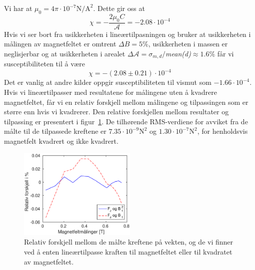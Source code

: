 \documentclass[a4paper,11pt, twocolumn]{article}
\begin{document}
Vi har at $\mu_0=4\pi\cdot10^{-7}\text{N/A}^2$. Dette gir oss at 
\begin{equation}
	\chi = -\frac{2\mu_0 C}{\mathcal{A}}= -2.08\cdot 10^{-4}
	\label{eq:susecpt}
\end{equation}
Hvis vi ser bort fra usikkerheten i lineærtilpasningen og bruker at usikkerheten i målingen av magnetfeltet er omtrent $\Delta B = 5\%$, usikkerheten i massen er neglisjerbar og at usikkerheten i arealet $\Delta\mathcal{A}=\sigma_{m,d}/$\textit{mean(d)}$\approx1.6\%$ får vi susceptibiliteten til å være 
\begin{equation}
	\chi = -(2.08\pm0.21) \cdot 10^{-4}
	\label{eq:chiResult}
\end{equation}
Det er vanlig at andre kilder oppgir susceptibiliteten til vismut som $-1.66\cdot 10^{-4}$.
Hvis vi lineærtilpasser med resultatene for målingene uten å kvadrere magnetfeltet, får vi en relativ forskjell mellom målingene og tilpassingen som er større enn hvis vi kvadrerer. Den relative forskjellen mellom resultater og tilpassing er presentert i figur~\ref{fig:relativForskjell}. De tilhørende RMS-verdiene for avviket fra de målte til de tilpassede kreftene er $7.35\cdot 10^{-9}\text{N}^2$ og $1.30\cdot 10^{-7}\text{N}^2$, for henholdsvis magnetfelt kvadrert og ikke kvadrert.

\begin{figure}[!ht]
	\centering
	\includegraphics[width = 0.5\textwidth]{matlab/relativForskjell.eps}
	\caption{Relativ forskjell mellom de målte kreftene på vekten, og de vi finner ved å enten lineærtilpasse kraften til magnetfeltet eller til kvadratet av magnetfeltet.}
	\label{fig:relativForskjell}
\end{figure}
\end{document}
